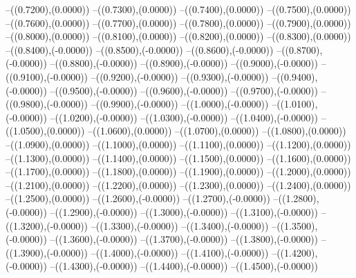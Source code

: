 {	--({\sx*(0.7200)},{\sy*(0.0000)})
	--({\sx*(0.7300)},{\sy*(0.0000)})
	--({\sx*(0.7400)},{\sy*(0.0000)})
	--({\sx*(0.7500)},{\sy*(0.0000)})
	--({\sx*(0.7600)},{\sy*(0.0000)})
	--({\sx*(0.7700)},{\sy*(0.0000)})
	--({\sx*(0.7800)},{\sy*(0.0000)})
	--({\sx*(0.7900)},{\sy*(0.0000)})
	--({\sx*(0.8000)},{\sy*(0.0000)})
	--({\sx*(0.8100)},{\sy*(0.0000)})
	--({\sx*(0.8200)},{\sy*(0.0000)})
	--({\sx*(0.8300)},{\sy*(0.0000)})
	--({\sx*(0.8400)},{\sy*(-0.0000)})
	--({\sx*(0.8500)},{\sy*(-0.0000)})
	--({\sx*(0.8600)},{\sy*(-0.0000)})
	--({\sx*(0.8700)},{\sy*(-0.0000)})
	--({\sx*(0.8800)},{\sy*(-0.0000)})
	--({\sx*(0.8900)},{\sy*(-0.0000)})
	--({\sx*(0.9000)},{\sy*(-0.0000)})
	--({\sx*(0.9100)},{\sy*(-0.0000)})
	--({\sx*(0.9200)},{\sy*(-0.0000)})
	--({\sx*(0.9300)},{\sy*(-0.0000)})
	--({\sx*(0.9400)},{\sy*(-0.0000)})
	--({\sx*(0.9500)},{\sy*(-0.0000)})
	--({\sx*(0.9600)},{\sy*(-0.0000)})
	--({\sx*(0.9700)},{\sy*(-0.0000)})
	--({\sx*(0.9800)},{\sy*(-0.0000)})
	--({\sx*(0.9900)},{\sy*(-0.0000)})
	--({\sx*(1.0000)},{\sy*(-0.0000)})
	--({\sx*(1.0100)},{\sy*(-0.0000)})
	--({\sx*(1.0200)},{\sy*(-0.0000)})
	--({\sx*(1.0300)},{\sy*(-0.0000)})
	--({\sx*(1.0400)},{\sy*(-0.0000)})
	--({\sx*(1.0500)},{\sy*(0.0000)})
	--({\sx*(1.0600)},{\sy*(0.0000)})
	--({\sx*(1.0700)},{\sy*(0.0000)})
	--({\sx*(1.0800)},{\sy*(0.0000)})
	--({\sx*(1.0900)},{\sy*(0.0000)})
	--({\sx*(1.1000)},{\sy*(0.0000)})
	--({\sx*(1.1100)},{\sy*(0.0000)})
	--({\sx*(1.1200)},{\sy*(0.0000)})
	--({\sx*(1.1300)},{\sy*(0.0000)})
	--({\sx*(1.1400)},{\sy*(0.0000)})
	--({\sx*(1.1500)},{\sy*(0.0000)})
	--({\sx*(1.1600)},{\sy*(0.0000)})
	--({\sx*(1.1700)},{\sy*(0.0000)})
	--({\sx*(1.1800)},{\sy*(0.0000)})
	--({\sx*(1.1900)},{\sy*(0.0000)})
	--({\sx*(1.2000)},{\sy*(0.0000)})
	--({\sx*(1.2100)},{\sy*(0.0000)})
	--({\sx*(1.2200)},{\sy*(0.0000)})
	--({\sx*(1.2300)},{\sy*(0.0000)})
	--({\sx*(1.2400)},{\sy*(0.0000)})
	--({\sx*(1.2500)},{\sy*(0.0000)})
	--({\sx*(1.2600)},{\sy*(-0.0000)})
	--({\sx*(1.2700)},{\sy*(-0.0000)})
	--({\sx*(1.2800)},{\sy*(-0.0000)})
	--({\sx*(1.2900)},{\sy*(-0.0000)})
	--({\sx*(1.3000)},{\sy*(-0.0000)})
	--({\sx*(1.3100)},{\sy*(-0.0000)})
	--({\sx*(1.3200)},{\sy*(-0.0000)})
	--({\sx*(1.3300)},{\sy*(-0.0000)})
	--({\sx*(1.3400)},{\sy*(-0.0000)})
	--({\sx*(1.3500)},{\sy*(-0.0000)})
	--({\sx*(1.3600)},{\sy*(-0.0000)})
	--({\sx*(1.3700)},{\sy*(-0.0000)})
	--({\sx*(1.3800)},{\sy*(-0.0000)})
	--({\sx*(1.3900)},{\sy*(-0.0000)})
	--({\sx*(1.4000)},{\sy*(-0.0000)})
	--({\sx*(1.4100)},{\sy*(-0.0000)})
	--({\sx*(1.4200)},{\sy*(-0.0000)})
	--({\sx*(1.4300)},{\sy*(-0.0000)})
	--({\sx*(1.4400)},{\sy*(-0.0000)})
	--({\sx*(1.4500)},{\sy*(-0.0000)})
}
